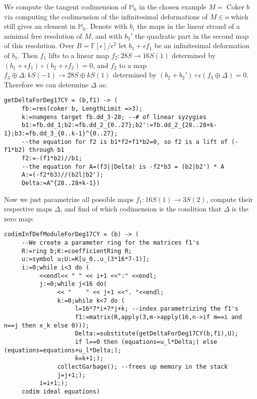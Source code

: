 \documentclass[12pt,leqno]{amsart}
\newcommand{\FF}{{\mathbb F}}
\newcommand{\MM}{{\mathbb M}}
\newlength{\ho}
\DeclareMathOperator{\Coker}{Coker}
\begin{document}
We compute the tangent codimension of $\MM_k$ in the chosen example $M=\Coker b$
via computing the codimension of the infinitesimal deformations of $M\in o$
which still gives an element in $\MM_k$.
Denote with $b_i$ the maps in the linear strand of a minimal free resolution of $M$, 
and with $b_2'$ the quadratic part in the second map of this resolution.
Over $B=\FF[\epsilon]/{\epsilon^2}$ 
let $b_1+\epsilon f_1$ be an infinitesimal deformation of $b_1$. 
Then $f_1$ lifts to a linear map $f_2\colon 28S \to 16S(1)$ determined by 
$(b_1+\epsilon f_1)\circ(b_2+\epsilon f_2)=0$, and $f_2$ to a map 
$f_3\oplus\Delta\colon k S(-1) \to 28 S\oplus k S(1)$ determined by
$(b_2+b_2')\circ\epsilon (f_3\oplus\Delta)=0$.
Therefore we can determine $\Delta$ as:
{\scriptsize
\begin{verbatim} 
getDeltaForDeg17CY = (b,f1) -> (
     fb:=res(coker b, LengthLimit =>3);
     k:=numgens target fb.dd_3-28; --# of linear syzygies
     b1:=fb.dd_1;b2:=fb.dd_2_{0..27};b2':=fb.dd_2_{28..28+k-1};b3:=fb.dd_3_{0..k-1}^{0..27};
     --the equation for f2 is b1*f2+f1*b2=0, so f2 is a lift of (-f1*b2) through b1 
     f2:=-(f1*b2)//b1;
     --the equation for A=(f3||Delta) is -f2*b3 = (b2|b2') * A
     A:=(-f2*b3)//(b2l|b2');
     Delta:=A^{28..28+k-1})
\end{verbatim}}
Now we just parametrize all possible maps $f_1\colon 16S(1) \to 3S(2)$,
compute their respective maps $\Delta$,
and find of which codimension is the condition that $\Delta$ is the zero map:
{\scriptsize
\begin{verbatim} 
codimInfDefModuleForDeg17CY = (b) -> (
     --We create a parameter ring for the matrices f1's
     R:=ring b;K:=coefficientRing R;
     u:=symbol u;U:=K[u_0..u_(3*16*7-1)];
     i:=0;while i<3 do (
          <<endl<< " " << i+1 <<":" <<endl;
          j:=0;while j<16 do(
               << "    " << j+1 <<". "<<endl;
               k:=0;while k<7 do (
                    l=16*7*i+7*j+k; --index parametrizing the f1's
                    f1:=matrix(R,apply(3,m->apply(16,n->if m==i and n==j then x_k else 0)));
                    Delta:=substitute(getDeltaForDeg17CY(b,f1),U);
                    if l==0 then (equations=u_l*Delta;) else (equations=equations+u_l*Delta;);
                    k=k+1;);
               collectGarbage(); --frees up memory in the stack
               j=j+1;);
          i=i+1;);
     codim ideal equations)
\end{verbatim}}
\end{document}
